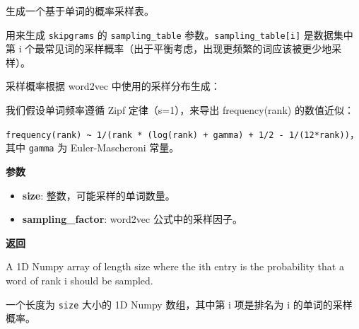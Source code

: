 \begin{Shaded}
\begin{Highlighting}[]
\OperatorTok{=}\NormalTok{)}
\end{Highlighting}
\end{Shaded}

生成一个基于单词的概率采样表。

用来生成 \texttt{skipgrams} 的 \texttt{sampling\_table}
参数。\texttt{sampling\_table{[}i{]}} 是数据集中第 i
个最常见词的采样概率（出于平衡考虑，出现更频繁的词应该被更少地采样）。

采样概率根据 word2vec 中使用的采样分布生成：

\begin{Shaded}
\begin{Highlighting}[]
\OperatorTok{=}\NormalTok{ (}\NormalTok{(}\OperatorTok{/}\OperatorTok{/}
\OperatorTok{/}
\end{Highlighting}
\end{Shaded}

我们假设单词频率遵循 Zipf 定律（s=1），来导出 frequency(rank)
的数值近似：

\texttt{frequency(rank)\ \textasciitilde{}\ 1/(rank\ *\ (log(rank)\ +\ gamma)\ +\ 1/2\ -\ 1/(12*rank))}，其中
\texttt{gamma} 为 Euler-Mascheroni 常量。

\textbf{参数}

\begin{itemize}
\tightlist
\item
  \textbf{size}: 整数，可能采样的单词数量。
\item
  \textbf{sampling\_factor}: word2vec 公式中的采样因子。
\end{itemize}

\textbf{返回}

A 1D Numpy array of length size where the ith entry is the probability
that a word of rank i should be sampled.

一个长度为 \texttt{size} 大小的 1D Numpy 数组，其中第 i 项是排名为 i
的单词的采样概率。


\newpage
